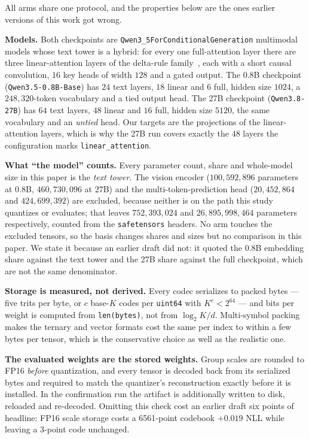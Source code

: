 \documentclass[11pt]{article}
\begin{document}
All arms share one protocol, and the properties below are the ones earlier
versions of this work got wrong.

\textbf{Models.} Both checkpoints are
\texttt{Qwen3\_5ForConditionalGeneration} multimodal models whose text tower is
a hybrid: for every one full-attention layer there are three linear-attention
layers of the delta-rule family~\cite{deltanet}, each with a short causal
convolution, $16$ key heads of width $128$ and a gated output. The 0.8B
checkpoint (\texttt{Qwen3.5-0.8B-Base}) has $24$ text layers, $18$ linear and
$6$ full, hidden size $1024$, a $248{,}320$-token vocabulary and a tied output
head. The 27B checkpoint (\texttt{Qwen3.8-27B}) has $64$ text layers, $48$
linear and $16$ full, hidden size $5120$, the same vocabulary and an
\emph{untied} head. Our targets are the projections of the linear-attention
layers, which is why the 27B run covers exactly the $48$ layers the
configuration marks \texttt{linear\_attention}.

\textbf{What ``the model'' counts.} Every parameter count, share and
whole-model size in this paper is the \emph{text tower}. The vision encoder
($100{,}592{,}896$ parameters at 0.8B, $460{,}730{,}096$ at 27B) and the
multi-token-prediction head ($20{,}452{,}864$ and $424{,}699{,}392$) are
excluded, because neither is on the path this study quantizes or evaluates;
that leaves $752{,}393{,}024$ and $26{,}895{,}998{,}464$ parameters
respectively, counted from the \texttt{safetensors} headers. No arm touches the
excluded tensors, so the basis changes shares and sizes but no comparison in
this paper. We state it because an earlier draft did not: it quoted the 0.8B
embedding share against the text tower and the 27B share against the full
checkpoint, which are not the same denominator.

\textbf{Storage is measured, not derived.} Every codec serializes to packed
bytes --- five trits per byte, or $c$ base-$K$ codes per \texttt{uint64} with
$K^{c} < 2^{64}$ --- and bits per weight is computed from \texttt{len(bytes)},
not from $\log_2 K / d$. Multi-symbol packing makes the ternary and
vector formats cost the same per index to within a few bytes per tensor, which
is the conservative choice as well as the realistic one.

\textbf{The evaluated weights are the stored weights.} Group scales are rounded
to FP16 \emph{before} quantization, and every tensor is decoded back from its
serialized bytes and required to match the quantizer's reconstruction exactly
before it is installed. In the confirmation run the artifact is additionally
written to disk, reloaded and re-decoded. Omitting this check cost an earlier
draft six points of headline: FP16 scale storage costs a 6561-point codebook
$+0.019$ NLL while leaving a 3-point code unchanged.
\end{document}
